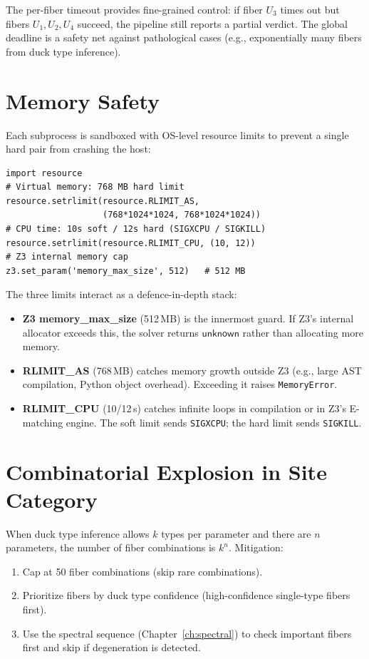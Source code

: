 \documentclass[11pt,a4paper]{report}
\theoremstyle{definition}
\theoremstyle{plain}
\begin{document}
\noindent
The per-fiber timeout provides fine-grained control: if fiber $U_3$
times out but fibers $U_1, U_2, U_4$ succeed, the pipeline still
reports a partial verdict.  The global deadline is a safety net
against pathological cases (e.g., exponentially many fibers from
duck type inference).

\section{Memory Safety}

Each subprocess is sandboxed with OS-level resource limits to
prevent a single hard pair from crashing the host:

\begin{lstlisting}[caption={Resource limits from \texttt{run\_benchmark.py}}]
import resource
# Virtual memory: 768 MB hard limit
resource.setrlimit(resource.RLIMIT_AS,
                   (768*1024*1024, 768*1024*1024))
# CPU time: 10s soft / 12s hard (SIGXCPU / SIGKILL)
resource.setrlimit(resource.RLIMIT_CPU, (10, 12))
# Z3 internal memory cap
z3.set_param('memory_max_size', 512)   # 512 MB
\end{lstlisting}

\noindent
The three limits interact as a defence-in-depth stack:
\begin{itemize}
  \item \textbf{Z3 memory\_max\_size} (512\,MB) is the innermost
    guard.  If Z3's internal allocator exceeds this, the solver
    returns $\mathsf{unknown}$ rather than allocating more memory.
  \item \textbf{RLIMIT\_AS} (768\,MB) catches memory growth outside
    Z3 (e.g., large AST compilation, Python object overhead).
    Exceeding it raises \texttt{MemoryError}.
  \item \textbf{RLIMIT\_CPU} (10/12\,s) catches infinite loops in
    compilation or in Z3's E-matching engine.  The soft limit
    sends \texttt{SIGXCPU}; the hard limit sends \texttt{SIGKILL}.
\end{itemize}

\section{Combinatorial Explosion in Site Category}

When duck type inference allows $k$ types per parameter and there
are $n$ parameters, the number of fiber combinations is $k^n$.
Mitigation:
\begin{enumerate}
  \item Cap at 50 fiber combinations (skip rare combinations).
  \item Prioritize fibers by duck type confidence (high-confidence
    single-type fibers first).
  \item Use the spectral sequence (Chapter~\ref{ch:spectral}) to
    check important fibers first and skip if degeneration is detected.
\end{enumerate}
\end{document}
